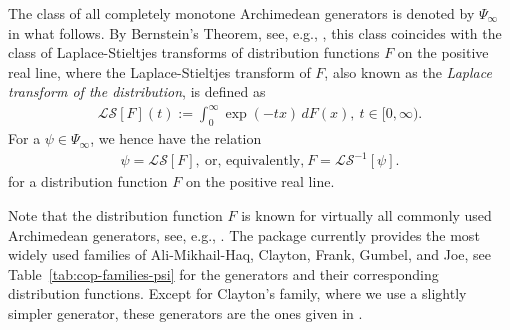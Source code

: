 \documentclass[nojss,article]{jss}
\theoremstyle{mythmstyle}
\newcommand*{\LS}{\mathcal{LS}}
\newcommand*{\LSi}{\LS^{-1}}
\newcommand*{\textcite}[2][]{\citet[#1]{#2}}
\begin{document}
The class of all completely monotone Archimedean generators is denoted by
$\Psi_\infty$ in what follows. By Bernstein's Theorem, see, e.g.,
\textcite[p.\ 439]{feller1971}, this class coincides with the class of
Laplace-Stieltjes transforms of distribution functions $F$ on the positive
real line, where the Laplace-Stieltjes transform of $F$, also known as the
\textit{Laplace transform of the distribution}, %
is defined as
\begin{align*}
  \LS[F](t):=\int_0^\infty\exp(-tx)\,dF(x),\ t\in[0,\infty).
\end{align*}
For a $\psi\in\Psi_\infty$, we hence have the relation
\begin{align*}
  \psi=\LS[F],\ \text{or, equivalently,}\ F=\LSi[\psi].
\end{align*}
for a distribution function $F$ on the positive real line.

Note that the distribution function $F$ is known for virtually all commonly
used Archimedean generators, see, e.g., \textcite[p.\ 62]{hofert2010c}. The
package  currently provides the most widely used families of
Ali-Mikhail-Haq, Clayton, Frank, Gumbel, and Joe, see Table~\ref{tab:cop-families-psi}
for the generators and their corresponding distribution functions. Except
for Clayton's family, where we use a slightly simpler generator, these
generators are the ones given in \textcite[pp.\ 116]{nelsen2007}.
\end{document}
